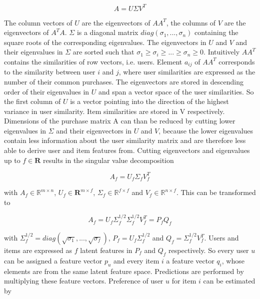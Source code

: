 \documentclass[10pt]{reportMaster}
\begin{document}
\begin{equation}
	A = U \Sigma V^T
\end{equation}

The column vectors of $U$ are the eigenvectors of $AA^T$, the columns of $V$ are the eigenvectors of $A^TA$.
$\Sigma$ is a diagonal matrix $diag(\sigma_1, ..., \sigma_n)$ containing the square roots of the corresponding eigenvalues.  %
The eigenvectors in $U$ and $V$ and their eigenvalues in $\Sigma$ are sorted such that $\sigma_1 \geq \sigma_i \geq ... \geq \sigma_n \geq 0$.
Intuitively $AA^T$ contains the similarities of row vectors, i.e. users.
Element $a_{ij}$ of $AA^T$ corresponds to the similarity between user $i$ and $j$, where user similarities are expressed as the number of their common purchases.
The eigenvectors are stored in descending order of their eigenvalues in $U$ and span a vector space of the user similarities.
So the first column of $U$ is a vector pointing into the direction of the highest variance in user similarity. 
Item similarities are stored in V respectively.
Dimensions of the purchase matrix A can than be reduced by cutting lower eigenvalues in $\Sigma$ and their eigenvectors in $U$ and $V$, because the lower eigenvalues contain less information about the user similarity matrix and are therefore less able to derive user and item features from.
Cutting eigenvectors and eigenvalues up to $f \in \mathbf{R}$ results in the singular value decomposition 

\begin{equation}
	A_f = U_f \Sigma_f V_f^T
\end{equation}

with $A_f \in \mathds{R}^{m \times n}$, $U_f \in \mathbf{R}^{m \times f}$, $\Sigma_f \in \mathds{R}^{f \times f}$ and $V_f \in \mathds{R}^{n \times f}$.
This can be transformed to 

\begin{equation}
	A_f = U_f \Sigma_f^{1/2} \Sigma_f^{1/2} V_f^T = P_f Q_f
\end{equation}

with $\Sigma_f^{1/2} = diag(\sqrt{\sigma_1}, ..., \sqrt{\sigma_f})$, $P_f = U_f \Sigma_f^{1/2}$ and $Q_f = \Sigma_f^{1/2} V_f^T$.
Users and items are expressed as $f$ latent features in $P_f$ and $Q_f$ respectively.
So every user $u$ can be assigned a feature vector $p_u$ and every item $i$ a feature vector $q_i$, whose elements are from the same latent feature space.
Predictions are performed by multiplying these feature vectors.
Preference of user $u$ for item $i$ can be estimated by 
\end{document}
